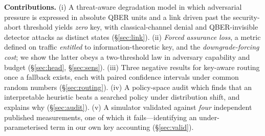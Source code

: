 \documentclass[conference]{IEEEtran}
\begin{document}
\textbf{Contributions.}
(i) A threat-aware degradation model in which adversarial pressure is expressed
in absolute QBER units and a link driven past the security-abort threshold yields
\emph{zero} key, with classical-channel denial and QBER-invisible detector
attacks as distinct states (\S\ref{sec:link}).
(ii) \emph{Forced assurance loss}, a metric defined on traffic \emph{entitled} to
information-theoretic key, and the \emph{downgrade-forcing cost}; we show the
latter obeys a two-threshold law in adversary capability and budget
(\S\ref{sec:head}, \S\ref{sec:sens}).
(iii) Three negative results for key-aware routing once a fallback exists, each
with paired confidence intervals under common random numbers
(\S\ref{sec:routing}).
(iv) A policy-space audit which finds that an interpretable heuristic beats a
searched policy under distribution shift, and explains why (\S\ref{sec:audit}).
(v) A simulator validated against \emph{four} independent published measurements,
one of which it fails---identifying an under-parameterised term in our own key
accounting (\S\ref{sec:valid}).
\end{document}
